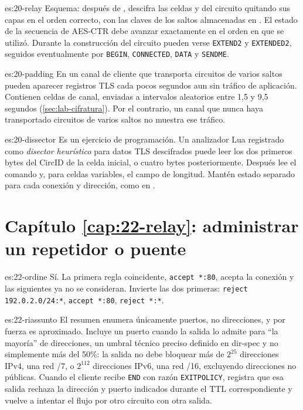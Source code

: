 \begin{soluzione}{es:20-relay}
Esquema: después de , descifra las celdas  y  del circuito quitando sus capas en el orden correcto, con las claves de los saltos almacenadas en . El estado de la secuencia de AES-CTR debe avanzar exactamente en el orden en que se utilizó. Durante la construcción del circuito pueden verse \texttt{EXTEND2} y \texttt{EXTENDED2}, seguidos eventualmente por \texttt{BEGIN}, \texttt{CONNECTED}, \texttt{DATA} y \texttt{SENDME}.
\end{soluzione}

\begin{soluzione}{es:20-padding}
En un canal de cliente que transporta circuitos de varios saltos pueden aparecer registros TLS cada pocos segundos aun sin tráfico de aplicación. Contienen celdas  de canal, enviadas a intervalos aleatorios entre 1,5 y 9,5 segundos (\cref{sec:lab-cifratura}). Por el contrario, un canal que nunca haya transportado circuitos de varios saltos no muestra ese tráfico.
\end{soluzione}

\begin{soluzione}{es:20-dissector}
Es un ejercicio de programación. Un analizador Lua registrado como \emph{disector heurístico} para datos TLS descifrados puede leer los dos primeros bytes del CircID de la celda  inicial, o cuatro bytes posteriormente. Después lee el comando y, para celdas variables, el campo de longitud. Mantén estado separado para cada conexión y dirección, como en .
\end{soluzione}

\section*{Capítulo \ref{cap:22-relay}: administrar un repetidor o puente}

\begin{soluzione}{es:22-ordine}
Sí. La primera regla coincidente, \texttt{accept *:80}, acepta la conexión y las siguientes ya no se consideran. Invierte las dos primeras: \texttt{reject 192.0.2.0/24:*}, \texttt{accept *:80}, \texttt{reject *:*}.
\end{soluzione}

\begin{soluzione}{es:22-riassunto}
El resumen enumera únicamente puertos, no direcciones, y por fuerza es aproximado. Incluye un puerto cuando la salida lo admite para \enquote{la mayoría} de direcciones, un umbral técnico preciso definido en dir-spec y no simplemente más del 50\%: la salida no debe bloquear más de $2^{25}$ direcciones IPv4, una red /7, o $2^{112}$ direcciones IPv6, una red /16, excluyendo direcciones no públicas. Cuando el cliente recibe \texttt{END} con razón \texttt{EXITPOLICY}, registra que esa salida rechaza la dirección y puerto indicados durante el TTL correspondiente y vuelve a intentar el flujo por otro circuito con otra salida.
\end{soluzione}


